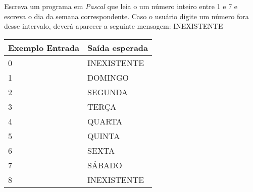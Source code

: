 \item Escreva um programa em \emph{Pascal} que leia o um número inteiro entre 1 e 7 e escreva o dia da semana correspondente. Caso o usuário digite um número fora desse intervalo, deverá aparecer a seguinte  mensagem: INEXISTENTE

\begin{center}
\begin{tabular}{|l|l|} \hline
Exemplo Entrada & Saída esperada \\ \hline
0 & INEXISTENTE \\ \hline
1 & DOMINGO \\ \hline
2 & SEGUNDA \\ \hline
3 & TERÇA \\ \hline
4 & QUARTA \\ \hline
5 & QUINTA \\ \hline
6 & SEXTA \\ \hline
7 & SÁBADO \\ \hline
8 & INEXISTENTE \\ \hline
\end{tabular}
\end{center}
